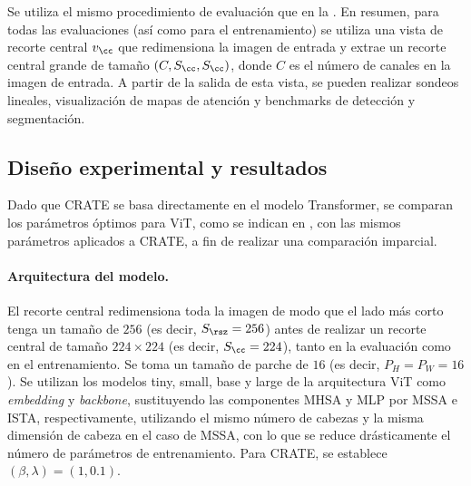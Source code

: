 \documentclass[../../book-main_es.tex]{subfiles}
\begin{document}
Se utiliza el mismo procedimiento de evaluación que en la
. En resumen, para todas las
evaluaciones (así como para el entrenamiento) se utiliza una vista de recorte central 
\(v_{\cc}\) que redimensiona la imagen de entrada y extrae un recorte central grande
de tamaño \((C, S_{\cc}, S_{\cc})\), donde \(C\) es el número de
canales en la imagen de entrada. A partir de la salida de esta vista, se pueden realizar 
sondeos lineales, visualización de mapas de atención y benchmarks de detección y segmentación.

\subsection{Diseño experimental y
resultados}\label{sub:image_classification_experiments}

Dado que CRATE se basa directamente en el modelo Transformer, se comparan los
parámetros óptimos para ViT, como se indican en
\cite{dosovitskiy2020image,touvron2020training}, con las mismos
parámetros aplicados a CRATE, a fin de realizar una comparación imparcial.

\paragraph{Arquitectura del modelo.} El recorte central redimensiona toda la
imagen de modo que el lado más corto tenga un tamaño de \(256\) (es decir, \(S_{\rsz} =
256\)) antes de realizar un recorte central de tamaño \(224 \times 224\) (es decir,
\(S_{\cc} = 224\)), tanto en la evaluación como en el entrenamiento. Se toma un tamaño de parche
de \(16\) (es decir, \(P_{H} = P_{W} = 16\)). Se utilizan los modelos tiny, small,
base y large de la arquitectura ViT \cite{dosovitskiy2020image}
como \textit{embedding} y \textit{backbone}, sustituyendo las componentes MHSA y
MLP por MSSA e ISTA, respectivamente, utilizando el mismo número
de cabezas y la misma dimensión de cabeza en el caso de MSSA, con lo que se
reduce drásticamente el número de parámetros de entrenamiento. Para CRATE,
se establece \((\beta, \lambda) = (1, 0.1)\).
\end{document}
